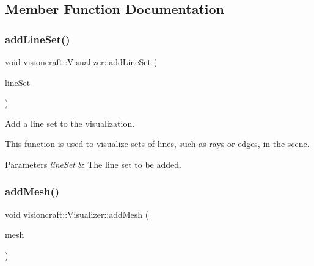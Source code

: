 \subsection{Member Function Documentation}
\mbox{\label{classvisioncraft_1_1Visualizer_a422ba320557820447ddc56226279af24}} 
\subsubsection{\texorpdfstring{add\+Line\+Set()}{addLineSet()}}
{\footnotesize\ttfamily void visioncraft\+::\+Visualizer\+::add\+Line\+Set (\begin{DoxyParamCaption}\item[{const std\+::shared\+\_\+ptr$<$ open3d\+::geometry\+::\+Line\+Set $>$ \&}]{line\+Set }\end{DoxyParamCaption})}



Add a line set to the visualization. 

This function is used to visualize sets of lines, such as rays or edges, in the scene.


\begin{DoxyParams}{Parameters}
{\em line\+Set} & The line set to be added. \\
\hline
\end{DoxyParams}
\mbox{\label{classvisioncraft_1_1Visualizer_a080245b7fcadd64909d789bbdf7e8197}} 
\subsubsection{\texorpdfstring{add\+Mesh()}{addMesh()}}
{\footnotesize\ttfamily void visioncraft\+::\+Visualizer\+::add\+Mesh (\begin{DoxyParamCaption}\item[{const std\+::shared\+\_\+ptr$<$ open3d\+::geometry\+::\+Triangle\+Mesh $>$ \&}]{mesh }\end{DoxyParamCaption})}



